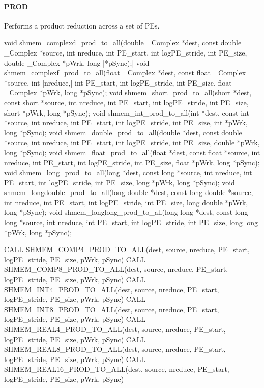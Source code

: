 \begin{apidefinition}
\paragraph{PROD}
Performs a product reduction across a set of \acp{PE}.\newline
\begin{Csynopsis}
void shmem_complexd_prod_to_all(double _Complex *dest, const double _Complex *source, int nreduce, int PE_start, int logPE_stride, int PE_size, double _Complex *pWrk, long |\mbox{*pSync);}|
void shmem_complexf_prod_to_all(float _Complex *dest, const float _Complex *source, int |\mbox{nreduce,}| int PE_start, int logPE_stride, int PE_size, float _Complex *pWrk, long *pSync);
void shmem_short_prod_to_all(short *dest, const short *source, int nreduce, int PE_start, int logPE_stride, int PE_size, short *pWrk, long *pSync);
void shmem_int_prod_to_all(int *dest, const int *source, int nreduce, int PE_start, int logPE_stride, int PE_size, int *pWrk, long *pSync);
void shmem_double_prod_to_all(double *dest, const double *source, int nreduce, int PE_start, int logPE_stride, int PE_size, double *pWrk, long *pSync);
void shmem_float_prod_to_all(float *dest, const float *source, int nreduce, int PE_start, int logPE_stride, int PE_size, float *pWrk, long *pSync);
void shmem_long_prod_to_all(long *dest, const long *source, int nreduce, int PE_start, int logPE_stride, int PE_size, long *pWrk, long *pSync);
void shmem_longdouble_prod_to_all(long double *dest, const long double *source, int nreduce, int PE_start, int logPE_stride, int PE_size, long double *pWrk, long *pSync);
void shmem_longlong_prod_to_all(long long *dest, const long long *source, int nreduce, int PE_start, int logPE_stride, int PE_size, long long *pWrk, long *pSync);
\end{Csynopsis}

\begin{Fsynopsis}
CALL SHMEM_COMP4_PROD_TO_ALL(dest, source, nreduce, PE_start, logPE_stride, PE_size, pWrk, pSync)
CALL SHMEM_COMP8_PROD_TO_ALL(dest, source, nreduce, PE_start, logPE_stride, PE_size, pWrk, pSync)
CALL SHMEM_INT4_PROD_TO_ALL(dest, source, nreduce, PE_start, logPE_stride, PE_size, pWrk, pSync)
CALL SHMEM_INT8_PROD_TO_ALL(dest, source, nreduce, PE_start, logPE_stride, PE_size, pWrk, pSync)
CALL SHMEM_REAL4_PROD_TO_ALL(dest, source, nreduce, PE_start, logPE_stride, PE_size, pWrk, pSync)
CALL SHMEM_REAL8_PROD_TO_ALL(dest, source, nreduce, PE_start, logPE_stride, PE_size, pWrk, pSync)
CALL SHMEM_REAL16_PROD_TO_ALL(dest, source, nreduce, PE_start, logPE_stride, PE_size, pWrk, pSync)
\end{Fsynopsis}


\end{apidefinition}
